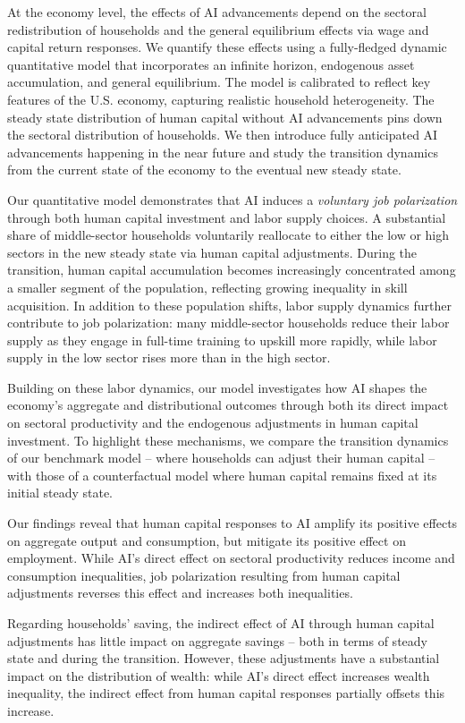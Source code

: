 \documentclass[12pt]{article}
\begin{document}
At the economy level, the effects of AI advancements depend on the sectoral redistribution of households and the general equilibrium effects via wage and capital return responses. We quantify these effects using a fully-fledged dynamic quantitative model that incorporates an infinite horizon, endogenous asset accumulation, and general equilibrium. The model is calibrated to reflect key features of the U.S. economy, capturing realistic household heterogeneity. The steady state distribution of human capital without AI advancements pins down the sectoral distribution of households. We then introduce fully anticipated AI advancements happening in the near future and study the transition dynamics from the current state of the economy to the eventual new steady state. 

Our quantitative model demonstrates that AI induces a \textit{voluntary job polarization} through both human capital investment and labor supply choices. A substantial share of middle-sector households voluntarily reallocate to either the low or high sectors in the new steady state via human capital adjustments. During the transition, human capital accumulation becomes increasingly concentrated among a smaller segment of the population, reflecting growing inequality in skill acquisition. In addition to these population shifts, labor supply dynamics further contribute to job polarization: many middle-sector households reduce their labor supply as they engage in full-time training to upskill more rapidly, while labor supply in the low sector rises more than in the high sector.

Building on these labor dynamics, our model investigates how AI shapes the economy’s aggregate and distributional outcomes through both its direct impact on sectoral productivity and the endogenous adjustments in human capital investment. To highlight these mechanisms, we compare the transition dynamics of our benchmark model -- where households can adjust their human capital -- with those of a counterfactual model where human capital remains fixed at its initial steady state.

Our findings reveal that human capital responses to AI amplify its positive effects on aggregate output and consumption, but mitigate its positive effect on employment. While AI's direct effect on sectoral productivity reduces income and consumption inequalities, job polarization resulting from human capital adjustments reverses this effect and increases both inequalities.

Regarding households' saving, the indirect effect of AI through human capital adjustments has little impact on aggregate savings -- both in terms of steady state and during the transition. However, these adjustments have a substantial impact on the distribution of wealth: while AI's direct effect increases wealth inequality, the indirect effect from human capital responses partially offsets this increase.
\end{document}
